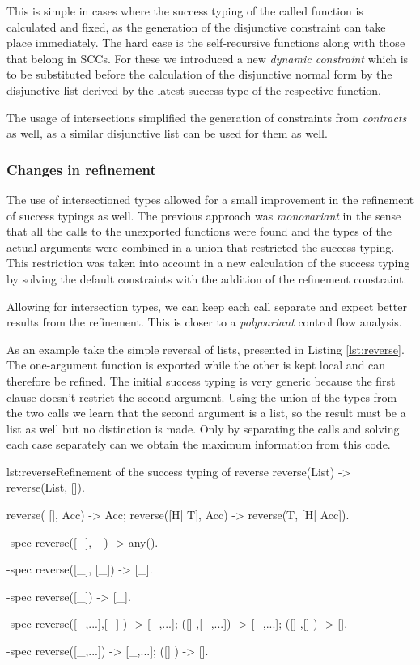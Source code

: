 This is simple in cases where the success typing of the called
function is calculated and fixed, as the generation of the disjunctive
constraint can take place immediately. The hard case is the
self-recursive functions along with those that belong in SCCs. For
these we introduced a new \emph{dynamic constraint} which is to be
substituted before the calculation of the disjunctive normal form by
the disjunctive list derived by the latest success type of the
respective function.

The usage of intersections simplified the generation of constraints
from \emph{contracts} as well, as a similar disjunctive list can be
used for them as well.

\subsubsection{Changes in refinement}
\label{sct:intersect_refinement}

The use of intersectioned types allowed for a small improvement in the
refinement of success typings as well. The previous approach was
\emph{monovariant} in the sense that all the calls to the unexported
functions were found and the types of the actual arguments were
combined in a union that restricted the success typing. This
restriction was taken into account in a new calculation of the success
typing by solving the default constraints with the addition of the
refinement constraint.

Allowing for intersection types, we can keep each call separate and
expect better results from the refinement. This is closer to a
\emph{polyvariant} control flow analysis.

As an example take the simple reversal of lists, presented in Listing
\ref{lst:reverse}. The one-argument function is exported while the
other is kept local and can therefore be refined. The initial success
typing is very generic because the first clause doesn't restrict the
second argument. Using the union of the types from the two calls we
learn that the second argument is a list, so the result must be a list
as well but no distinction is made. Only by separating the calls and
solving each case separately can we obtain the maximum information
from this code.

\begin{console}{lst:reverse}{Refinement of the success typing of reverse}
reverse(List) ->
  reverse(List, []).

reverse(    [], Acc) -> Acc;
reverse([H| T], Acc) -> reverse(T, [H| Acc]).

-spec reverse([_], _) -> any().

-spec reverse([_], [_]) -> [_].

-spec reverse([_]) -> [_].

-spec reverse([_,...],[_]    ) -> [_,...];
             ([]     ,[_,...]) -> [_,...]; 
             ([]     ,[]     ) -> [].

-spec reverse([_,...]) -> [_,...];
             ([]     ) -> [].
\end{console}
